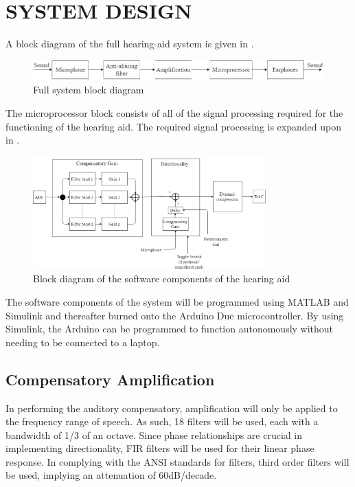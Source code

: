 \documentclass[10pt,twocolumn]{witseiepaper}
\begin{document}
\section{SYSTEM DESIGN}

A block diagram of the full hearing-aid system is given in .

\begin{figure}[t]
	\centering
	\includegraphics[width=1\textwidth]{highLeveLSystemDiagram.png}
	\caption{Full system block diagram}
	\raggedright
	\label{fig:block}	
\end{figure}

The microprocessor block consists of all of the signal processing required for the functioning of the hearing aid. The required signal processing is expanded upon in .

\begin{figure}[t]
	\centering
	\includegraphics[width=0.8\textwidth]{microBlockDiagrm.png}
	\caption{Block diagram of the software components of the hearing aid}
	\raggedright
	\label{fig:microBlock}	
\end{figure}

The software components of the system will be programmed using MATLAB and Simulink and thereafter burned onto the Arduino Due microcontroller. By using Simulink, the Arduino can be programmed to function autonomously without needing to be connected to a laptop.

\subsection{Compensatory Amplification} \label{sec:amplification}
In performing the auditory compensatory, amplification will only be applied to the frequency range of speech. As such, 18 filters will be used, each with a bandwidth of 1/3 of an octave. Since phase relationships are crucial in implementing directionality, FIR filters will be used for their linear phase response. In complying with the ANSI standards for filters, third order filters will be used, implying an attenuation of 60dB/decade.
\end{document}
